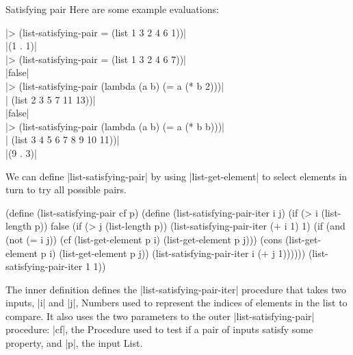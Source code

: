 \begin{schemeregion}
{\begin{example}{Satisfying pair}
Here are some example evaluations:
\begin{code}
\scheme|> (list-satisfying-pair = (list 1 3 2 4 6 1))|\\
\schemeresult|(1 . 1)|\\
\scheme|> (list-satisfying-pair = (list 1 3 2 4 6 7))|\\
\schemeresult|false|\\
\scheme|> (list-satisfying-pair (lambda (a b) (= a (* b 2)))|\\
\scheme|                        (list 2 3 5 7 11 13))|\\
\schemeresult|false|\\
\scheme|> (list-satisfying-pair (lambda (a b) (= a (* b b)))|\\
\scheme|                        (list 3 4 5 6 7 8 9 10 11))|\\
\schemeresult|(9 . 3)|
\end{code}

We can define \scheme|list-satisfying-pair| by using \scheme|list-get-element| to select elements in turn to try all possible pairs.  

\begin{schemedisplay}
(define (list-satisfying-pair cf p)
  (define (list-satisfying-pair-iter i j)
    (if (> i (list-length p))
        false
        (if (> j (list-length p))
            (list-satisfying-pair-iter (+ i 1) 1)
            (if (and (not (= i j)) 
                     (cf (list-get-element p i) (list-get-element p j)))
                (cons (list-get-element p i) (list-get-element p j))
                (list-satisfying-pair-iter i (+ j 1))))))
  (list-satisfying-pair-iter 1 1))      
\end{schemedisplay}

The inner definition defines the \scheme|list-satisfying-pair-iter| procedure that takes two inputs, \scheme|i| and \scheme|j|, Numbers used to represent the indices of elements in the list to compare.  It also uses the two parameters to the outer \scheme|list-satisfying-pair| procedure: \scheme|cf|, the Procedure used to test if a pair of inputs satisfy some property, and \scheme|p|, the input List.


\end{example}}
\end{schemeregion}
